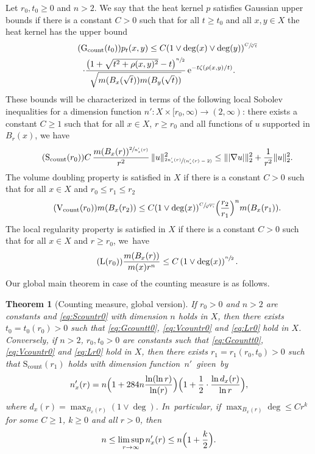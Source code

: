 \documentclass[10pt]{amsart}
\newcommand{\spfrac}[2]{\sfrac{#1}{(#2)}}
\newcommand{\rcount}{\mathrm{count}}
\newcommand{\rG}{\mathrm{G}}
\newcommand{\rS}{\mathrm{S}}
\newcommand{\rV}{\mathrm{V}}
\theoremstyle{plain}
\newtheorem{theorem}{Theorem}[section]
\theoremstyle{definition}
\newcommand{\euler}{\mathrm{e}}
\begin{document}
Let $r_0,t_0\geq 0$ and $n>2$.
We say that the heat kernel $p$ satisfies Gaussian upper bounds if there is a constant $C>0$ such that for all $t\geq t_0$ and all $x,y\in X$ the heat kernel has the upper bound
\begin{multline}\tag{$\rG_{\rcount}(t_0)$}\label{eq:Gcountt0}
p_{t}(x,y)
\leq C(1\vee \deg(x)\vee \deg(y))
^{\sfrac{C}{\!\sqrt[ n]{t}}}\\
\cdot
\frac{\bigl(1+\sqrt{t^2+\rho(x,y)^2}-t\bigr)^{\sfrac{n}{2}}}
{\sqrt{m(B_{x}(\sqrt {t}))m(B_{y}(\sqrt {t}))}}\,
\euler^{-t\zeta(\rho(x,y)/t)}.
\end{multline}
These bounds will be characterized in terms of the following local Sobolev inequalities for a dimension function $n'\colon X\times [r_0,\infty)\to(2,\infty)$: there exists a {constant} $C\geq 1$ such that for all $x\in X$, $r\geq r_0$ and all functions of $u$ supported in $B_r(x)$, we have
\begin{equation}\tag{$\rS_{\rcount}(r_0)$}\label{eq:Scountr0}
C\,\frac{m(B_x(r))^{\sfrac{2}{n'_x(r)}}}{r^2}\,
\Vert u\Vert_{\spfrac{2n'_x(r)}{n'_x(r)-2}}^2
\leq \Vert \vert\nabla u\vert\Vert_2^2+\frac{1}{r^2}\Vert u\Vert_2^2.
\end{equation}
The {volume doubling} property is satisfied in $X$ if there is a constant $C>0$ such that for all $x\in X$ and $r_0\leq r_1\leq r_2$
\begin{equation}\tag{$\rV_{\rcount}(r_0)$}\label{eq:Vcountr0}
m(B_x(r_2))\leq C(1\vee\deg(x))
^{\sfrac{C}{\!\sqrt[ n]{r_1}}}\Bigl(\frac{r_2}{r_1}\Bigr)^{n} m(B_x(r_1)).
\end{equation}
The local regularity property is satisfied in $ X $ if there is a constant $C>0$ such that for all $x\in X$ and $r\geq r_0$, we~have
\begin{equation}\tag{L$(r_0)$}\label{eq:Lr0}
\frac{m(B_x(r))}{m(x)r^n}
\leq C\left(1\vee\deg(x)\right)^{\sfrac{n}2}.
\end{equation}
Our global main theorem in case of the counting measure is as follows.

\begin{theorem}[Counting measure, global version]\label{thm:countingglobal}
If $r_0>0$ and $n>2$ are constants and \eqref{eq:Scountr0} with dimension $n$ holds in $X$, then there exists \hbox{$t_0=t_0(r_0)>0$} such that \eqref{eq:Gcountt0}, \eqref{eq:Vcountr0} and \eqref{eq:Lr0} hold in $X$. Conversely, if $n{>2}$, $r_0,t_0>0$ are constants such that \eqref{eq:Gcountt0}, \eqref{eq:Vcountr0} and \eqref{eq:Lr0} hold in $X$, then there exists $r_1=r_1(r_0,t_0)>0$ such that $\rS_\rcount(r_1)$ holds with dimension function~$n'$~given~by
\[
n_x'(r)
=
n \Bigl(1+284n\frac{\ln(\ln r) }{\ln(r) } \Bigr)\Bigl(1+\frac{1}{2}\cdot\frac{\ln d_{x}(r)}{\ln r}\Bigr),
\]
where $d_x(r)=\max_{B_x(r)}(1\vee\deg)$. In~particular, if $\max_{B_x(r)}\deg\leq C r^k$ for some $C\geq 1$, $k\geq 0$ and all $r>0$, then
\[
n\leq \limsup_{r\to\infty}n'_x(r)\leq n\Bigl(1+\frac{k}{2}\Bigr).
\]
\end{theorem}
\end{document}
